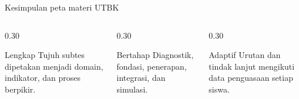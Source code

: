 \begin{frame}{Kesimpulan peta materi UTBK}
  \begin{columns}[T,onlytextwidth]
    \begin{column}{0.30\textwidth}
      \begin{block}{Lengkap}
        Tujuh subtes dipetakan menjadi domain, indikator, dan proses berpikir.
      \end{block}
    \end{column}
    \begin{column}{0.30\textwidth}
      \begin{block}{Bertahap}
        Diagnostik, fondasi, penerapan, integrasi, dan simulasi.
      \end{block}
    \end{column}
    \begin{column}{0.30\textwidth}
      \begin{block}{Adaptif}
        Urutan dan tindak lanjut mengikuti data penguasaan setiap siswa.
      \end{block}
    \end{column}
  \end{columns}
  \vspace{0.28cm}
\end{frame}
